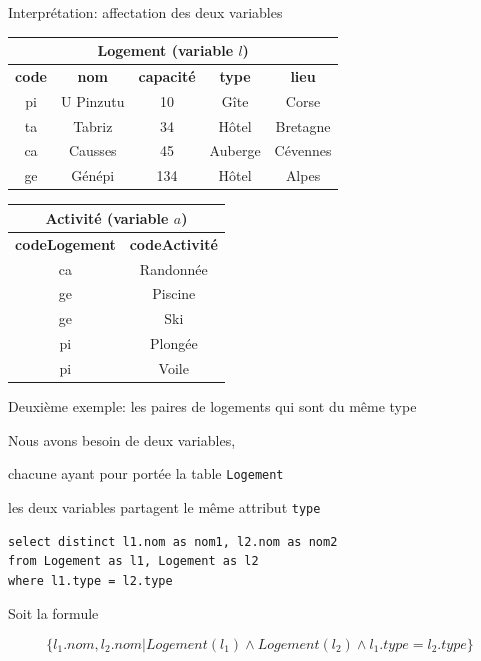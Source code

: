 \begin{frame}[fragile]{Interprétation: affectation des deux variables}

\begin{tabular}{c|c|c|c|c}
\multicolumn{5}{c}{\textbf{Logement (variable $l$)}}\\ \hline
\textbf{code} & \textbf{nom} & \textbf{capacité} & \textbf{type} & \textbf{lieu}\\ \hline 
pi & U Pinzutu & 10 & Gîte & Corse\\ \hline 
ta & Tabriz & 34 & Hôtel & Bretagne\\ \hline 
ca & Causses & 45 & Auberge & Cévennes\\ \hline 
\rowcolor{asparagus}
ge & Génépi & 134 & Hôtel & Alpes\\ \hline 
\end{tabular}

\vspace*{0.3cm}



\begin{tabular}{c|c}
\multicolumn{2}{c}{\textbf{Activité  (variable $a$)}}\\ \hline
\textbf{codeLogement} & \textbf{codeActivité}\\ \hline 
ca & Randonnée\\ \hline 
ge & Piscine\\ \hline 
\rowcolor{bananamania}
ge & Ski\\ \hline 
pi & Plongée\\ \hline 
pi & Voile\\ \hline 
\end{tabular}

\end{frame}


\begin{frame}[fragile]{Deuxième exemple: les paires de logements qui sont du même type}


Nous avons besoin de deux variables, 
\begin{redbullet}
   \item \alert{chacune ayant pour portée la table \texttt{Logement}}
   \item \alert{les deux variables partagent le même attribut \texttt{type}}
\end{redbullet}

\vfill

\begin{verbatim}
select distinct l1.nom as nom1, l2.nom as nom2
from Logement as l1, Logement as l2
where l1.type = l2.type
\end{verbatim}

\vfill
\begin{blocgauche}
Soit la formule

$$\{ l_1.nom, l_2.nom | Logement(l_1) \land Logement(l_2) \land l_1.type = l_2.type \}$$
\end{blocgauche}
\end{frame}


